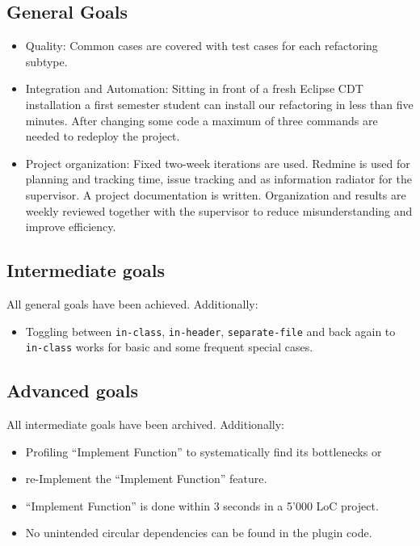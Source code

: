 \documentclass[a4paper,10pt]{scrreprt}
\begin{document}
\pagebreak

\subsection*{General Goals}

\begin{itemize}
 \item Quality: Common cases are covered with test cases for each
refactoring subtype.
 \item Integration and Automation: Sitting in front of a fresh Eclipse CDT installation a first
semester student can install our refactoring in less than five minutes. After changing some code a maximum of three commands are needed to redeploy the project.
 \item Project organization: Fixed two-week iterations are used. Redmine is used for planning and tracking time, issue tracking and as information radiator for the supervisor. A project documentation is written. Organization and results are weekly reviewed together with the supervisor to reduce misunderstanding and improve efficiency.
\end{itemize}

\subsection*{Intermediate goals}

All general goals have been achieved. Additionally:
\begin{itemize}
 \item Toggling between \texttt{in-class}, \texttt{in-header},
\texttt{separate-file} and back again to \texttt{in-class} works for basic and some frequent special cases.
\end{itemize}

\subsection*{Advanced goals}
All intermediate goals have been archived. Additionally:
\begin{itemize}
 \item Profiling ``Implement Function'' to systematically find its bottlenecks or
 \item re-Implement the ``Implement Function'' feature.
 \item ``Implement Function'' is done within 3 seconds in a 5'000 LoC project.
 \item No unintended circular dependencies can be found in the plugin code.
\end{itemize}
\end{document}
